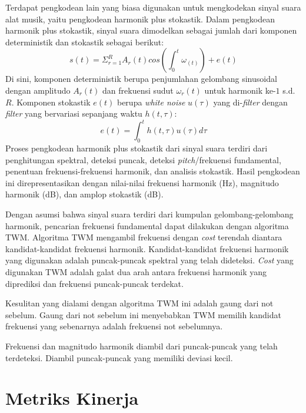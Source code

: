 Terdapat pengkodean lain yang biasa digunakan untuk mengkodekan sinyal suara alat musik, yaitu pengkodean harmonik plus stokastik. Dalam pengkodean harmonik plus stokastik, sinyal suara dimodelkan sebagai jumlah dari komponen deterministik dan stokastik sebagai berikut:\parencite{serra1997sineplusnoise}
\begin{equation}
s(t)=\Sigma_{r=1}^{R} A_r(t) cos (\int_0^t\omega_(t))+e(t)
\end{equation}
Di sini, komponen deterministik berupa penjumlahan gelombang sinusoidal dengan amplitudo $A_r(t)$ dan frekuensi sudut $\omega_r(t)$ untuk harmonik ke-$1$ s.d. $R$. Komponen stokastik $e(t)$ berupa \textit{white noise} $u(\tau)$ yang di-\textit{filter} dengan \textit{filter} yang bervariasi sepanjang waktu $h(t,\tau)$: \parencite{serra1997sineplusnoise}
\begin{equation}
e(t)=\int_0^t h(t,\tau)u(\tau)d\tau
\end{equation}
Proses pengkodean harmonik plus stokastik dari sinyal suara terdiri dari penghitungan spektral, deteksi puncak, deteksi \textit{pitch}/frekuensi fundamental, penentuan frekuensi-frekuensi harmonik, dan analisis stokastik. Hasil pengkodean ini direpresentasikan dengan nilai-nilai frekuensi harmonik (Hz), magnitudo harmonik (dB), dan amplop stokastik (dB). \parencite{serra1997sineplusnoise}

Dengan asumsi bahwa sinyal suara terdiri dari kumpulan gelombang-gelombang harmonik, pencarian frekuensi fundamental dapat dilakukan dengan algoritma TWM. Algoritma TWM mengambil frekuensi dengan \textit{cost} terendah diantara kandidat-kandidat frekuensi harmonik. Kandidat-kandidat frekuensi harmonik yang digunakan adalah puncak-puncak spektral yang telah dideteksi. \textit{Cost} yang digunakan TWM adalah galat dua arah antara frekuensi harmonik yang diprediksi dan frekuensi puncak-puncak terdekat. \parencite{beauchamp1994twm}

Kesulitan yang dialami dengan algoritma TWM ini adalah gaung dari not sebelum. Gaung dari not sebelum ini menyebabkan TWM memilih kandidat frekuensi yang sebenarnya adalah frekuensi not sebelumnya. \parencite{beauchamp1994twm}

Frekuensi dan magnitudo harmonik diambil dari puncak-puncak yang telah terdeteksi. Diambil puncak-puncak yang memiliki deviasi kecil. \parencite{sierra1990sms}

\section{Metriks Kinerja}

